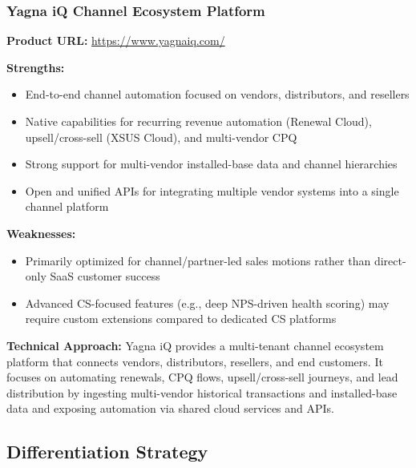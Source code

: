 \documentclass[12pt,a4paper]{article}
\begin{document}
\subsubsection{Yagna iQ Channel Ecosystem Platform}
\textbf{Product URL:} \url{https://www.yagnaiq.com/}

\textbf{Strengths:}
\begin{itemize}
    \item End-to-end channel automation focused on vendors, distributors, and resellers
    \item Native capabilities for recurring revenue automation (Renewal Cloud), upsell/cross-sell (XSUS Cloud), and multi-vendor CPQ
    \item Strong support for multi-vendor installed-base data and channel hierarchies
    \item Open and unified APIs for integrating multiple vendor systems into a single channel platform
\end{itemize}

\textbf{Weaknesses:}
\begin{itemize}
    \item Primarily optimized for channel/partner-led sales motions rather than direct-only SaaS customer success
    \item Advanced CS-focused features (e.g., deep NPS-driven health scoring) may require custom extensions compared to dedicated CS platforms
\end{itemize}

\textbf{Technical Approach:} Yagna iQ provides a multi-tenant channel ecosystem platform that connects vendors, distributors, resellers, and end customers. It focuses on automating renewals, CPQ flows, upsell/cross-sell journeys, and lead distribution by ingesting multi-vendor historical transactions and installed-base data and exposing automation via shared cloud services and APIs.

\subsection{Differentiation Strategy}
\end{document}
